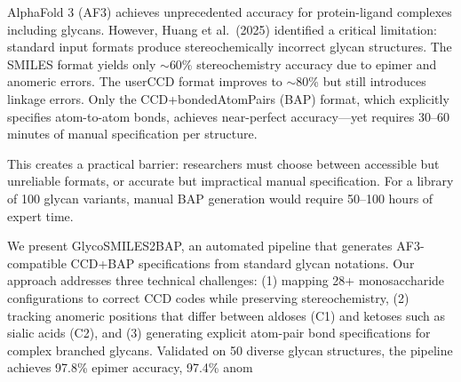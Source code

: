 \documentclass[11pt,a4paper]{article}
\begin{document}
AlphaFold 3 (AF3) achieves unprecedented accuracy for protein-ligand complexes including glycans. However, Huang et al.\ (2025) identified a critical limitation: standard input formats produce stereochemically incorrect glycan structures. The SMILES format yields only $\sim$60\% stereochemistry accuracy due to epimer and anomeric errors. The userCCD format improves to $\sim$80\% but still introduces linkage errors. Only the CCD+bondedAtomPairs (BAP) format, which explicitly specifies atom-to-atom bonds, achieves near-perfect accuracy---yet requires 30--60 minutes of manual specification per structure.

This creates a practical barrier: researchers must choose between accessible but unreliable formats, or accurate but impractical manual specification. For a library of 100 glycan variants, manual BAP generation would require 50--100 hours of expert time.

We present GlycoSMILES2BAP, an automated pipeline that generates AF3-compatible CCD+BAP specifications from standard glycan notations. Our approach addresses three technical challenges: (1) mapping 28+ monosaccharide configurations to correct CCD codes while preserving stereochemistry, (2) tracking anomeric positions that differ between aldoses (C1) and ketoses such as sialic acids (C2), and (3) generating explicit atom-pair bond specifications for complex branched glycans. Validated on 50 diverse glycan structures, the pipeline achieves 97.8\% epimer accuracy, 97.4\% anom
\end{document}

